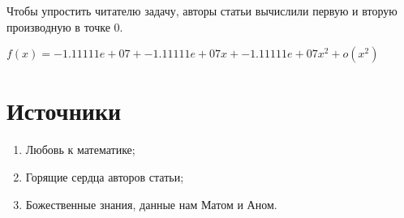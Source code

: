 \documentclass{article}
\begin{document}
Чтобы упростить читателю задачу, авторы статьи вычислили первую и вторую производную в точке 0.



 $f(x) = -1.11111e+07 + -1.11111e+07x + -1.11111e+07x^2 + o(x^2)$ \section*{Источники}
\begin{enumerate}
	\item Любовь к математике;
	\item Горящие сердца авторов статьи;
	\item Божественные знания, данные нам Матом и Аном.
\end{enumerate}
\end{document}
